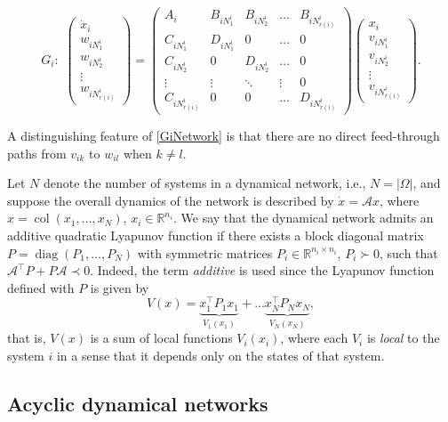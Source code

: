 \documentclass[11pt,a4paper,oneside,DIV=12,headings=small]{scrartcl}
\newcommand{\Rset}{\mathbb{R}}
\newcommand{\cA}{\mathcal{A}}
\newcommand{\diag}{\operatorname{diag}}
\newcommand{\col}{\operatorname{col}}
\theoremstyle{plain}
\begin{document}
\begin{equation}
\label{GiNetwork}
G_i: \,\, \begin{pmatrix}\dot{x}_i \\ w_{iN_1^i} \\ w_{iN_2^i} \\ \vdots \\ w_{iN_{r(i)}^i} \end{pmatrix}=
\begin{pmatrix} A_i & B_{iN_1^i} & B_{iN_2^i} & \ldots & B_{iN_{r(i)}^i} \\
C_{iN_1^i} & D_{iN_1^i} & 0 & \ldots & 0 \\
C_{iN_2^i} & 0 & D_{iN_2^i} & \ldots & 0\\
\vdots & \vdots & \ddots & \vdots & 0\\
C_{iN_{r(i)}^i} & 0 & 0 & \ldots & D_{iN_{r(i)}^i} \end{pmatrix}
\begin{pmatrix} x_i\\ v_{iN_1^i} \\ v_{iN_2^i} \\ \vdots \\ v_{iN_{r(i)}^i} \end{pmatrix}. 
\end{equation}

A distinguishing feature of \eqref{GiNetwork} is that there are no direct feed-through paths from $v_{ik}$ to $w_{il}$ when $k \neq l$.

Let $N$ denote the number of systems in a dynamical network, i.e., $N=|\Omega|$, and suppose the overall dynamics of the network is described by $\dot{x}=\cA x$, where $x=\col(x_1,\ldots,x_N)$, $x_i \in \Rset^{n_i}$. We say that the dynamical network admits an additive quadratic Lyapunov function if there exists a block diagonal matrix $P=\diag(P_1,\ldots,P_N)$ with symmetric matrices $P_i\in\Rset^{n_i \times n_i}$, $P_i \succ 0$, such that $\cA^\top P + P \cA \prec 0$. Indeed, the term \emph{additive} is used since the Lyapunov function defined with $P$ is given by
\begin{equation}
\label{AdditiveLyap}
V(x)=\underbrace{x_1^\top P_1 x_1}_{V_1(x_1)} + \ldots \underbrace{x_N^\top P_N x_N}_{V_N(x_N)},
\end{equation}
that is, $V(x)$ is a sum of local functions $V_i(x_i)$, where each $V_i$ is \emph{local} to the system $i$ in a sense that it depends only on the states of that system. 

\subsection{Acyclic dynamical networks}
\label{SecIV_B}
\end{document}
